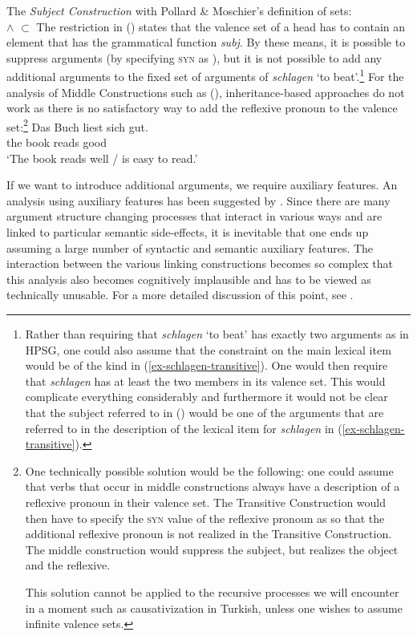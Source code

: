 \ea
The \emph{Subject Construction} with Pollard \& Moschier's definition of sets:\\
 $\wedge$  $\subset$ 
\z
The restriction in () states that the valence set of a head has to contain an element that has the grammatical function \emph{subj}.
By these means, it is possible to suppress arguments (by specifying \textsc{syn} as ),
but it is not possible to add any additional arguments to the fixed set of arguments of
\emph{schlagen} `to beat'.\footnote{%
  Rather than requiring that \emph{schlagen} `to beat' has exactly two arguments as in HPSG, one could also assume that the constraint on the main lexical item would be of the kind in
  (\ref{ex-schlagen-transitive}). One would then require that \emph{schlagen} has at least the two
members in its valence set. This would complicate everything considerably and furthermore it would
not be clear that the subject referred to in () would be one of the arguments that are
referred to in the description of the lexical item for \emph{schlagen} in (\ref{ex-schlagen-transitive}). 
}
For the analysis of Middle Constructions such as (), inheritance-based approaches do not work as there is no
satisfactory way to add the reflexive pronoun to the valence set:\footnote{
	One technically possible solution would be the following: one could assume that verbs that occur in middle constructions always have a description
	of a reflexive pronoun in their valence set. The Transitive Construction would then have to
        specify the \textsc{syn} value of the reflexive pronoun
	as  so that the additional reflexive pronoun is not realized in the Transitive Construction. The middle construction would suppress the subject,
	but realizes the object and the reflexive.

		This solution cannot be applied to the recursive processes we will encounter in a moment such as causativization in Turkish, unless one
		wishes to assume infinite valence sets.
}
\ea
\gll Das Buch liest sich gut.\\
	 the book reads  good\\
\glt `The book reads well / is easy to read.'
\z

\noindent
If we want to introduce additional arguments, we require auxiliary features. An analysis using auxiliary features has been suggested by 
\citet{Koenig99a}. Since there are many argument structure changing processes that interact in various ways and are linked to particular
semantic side-effects, it is inevitable that one ends up assuming a large number of syntactic and semantic auxiliary features.
The interaction between the various linking constructions becomes so complex that this analysis also becomes cognitively implausible
and has to be viewed as technically unusable. For a more detailed discussion of this point, see .

